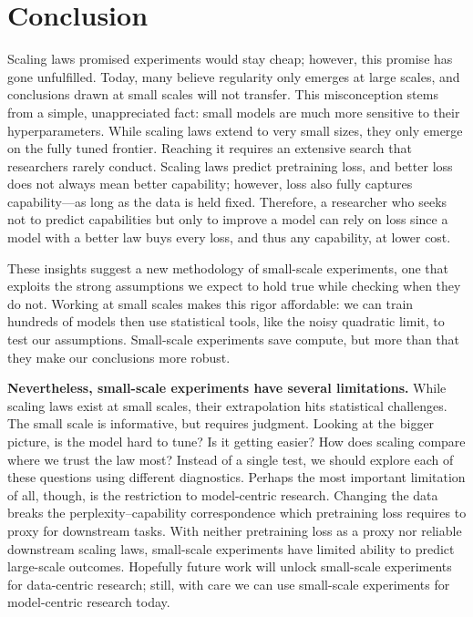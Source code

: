 \section{Conclusion}
\label{sec:conclusion}

Scaling laws promised experiments would stay cheap; however, this promise has gone unfulfilled. Today, many believe regularity only emerges at large scales, and conclusions drawn at small scales will not transfer.
%
This misconception stems from a simple, unappreciated fact: small models are much more sensitive to their hyperparameters. While scaling laws extend to very small sizes, they only emerge on the fully tuned frontier. Reaching it requires an extensive search that researchers rarely conduct. Scaling laws predict pretraining loss, and better loss does not always mean better capability; however, loss also fully captures capability---as long as the data is held fixed. Therefore, a researcher who seeks not to predict capabilities but only to improve a model can rely on loss since a model with a better law buys every loss, and thus any capability, at lower cost.

These insights suggest a new methodology of small-scale experiments, one that exploits the strong assumptions we expect to hold true while checking when they do not. Working at small scales makes this rigor affordable: we can train hundreds of models then use statistical tools, like the noisy quadratic limit, to test our assumptions. Small-scale experiments save compute, but more than that they make our conclusions more robust.

\textbf{Nevertheless, small-scale experiments have several limitations.} While scaling laws exist at small scales, their extrapolation hits statistical challenges. The small scale is informative, but requires judgment. Looking at the bigger picture, is the model hard to tune? Is it getting easier? How does scaling compare where we trust the law most? Instead of a single test, we should explore each of these questions using different diagnostics.
%
Perhaps the most important limitation of all, though, is the restriction to model-centric research. Changing the data breaks the perplexity--capability correspondence which pretraining loss requires to proxy for downstream tasks. With neither pretraining loss as a proxy nor reliable downstream scaling laws, small-scale experiments have limited ability to predict large-scale outcomes. Hopefully future work will unlock small-scale experiments for data-centric research; still, with care we can use small-scale experiments for model-centric research today.

